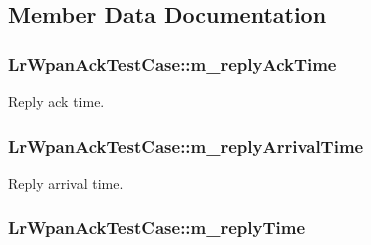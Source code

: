 \subsection{Member Data Documentation}
\subsubsection[{\texorpdfstring{m\+\_\+reply\+Ack\+Time}{m_replyAckTime}}]{ Lr\+Wpan\+Ack\+Test\+Case\+::m\+\_\+reply\+Ack\+Time\hspace{0.3cm}{\ttfamily [private]}}\hypertarget{classLrWpanAckTestCase_ae34a3c8910c08e9442e258e35fd3930f}{}\label{classLrWpanAckTestCase_ae34a3c8910c08e9442e258e35fd3930f}


Reply ack time. 

\subsubsection[{\texorpdfstring{m\+\_\+reply\+Arrival\+Time}{m_replyArrivalTime}}]{ Lr\+Wpan\+Ack\+Test\+Case\+::m\+\_\+reply\+Arrival\+Time\hspace{0.3cm}{\ttfamily [private]}}\hypertarget{classLrWpanAckTestCase_af07e2f06722c98c42d0ffa89b2be052c}{}\label{classLrWpanAckTestCase_af07e2f06722c98c42d0ffa89b2be052c}


Reply arrival time. 

\subsubsection[{\texorpdfstring{m\+\_\+reply\+Time}{m_replyTime}}]{ Lr\+Wpan\+Ack\+Test\+Case\+::m\+\_\+reply\+Time\hspace{0.3cm}{\ttfamily [private]}}\hypertarget{classLrWpanAckTestCase_a1c185cc47cafba81b7f2b00ed2d22b5f}{}\label{classLrWpanAckTestCase_a1c185cc47cafba81b7f2b00ed2d22b5f}



